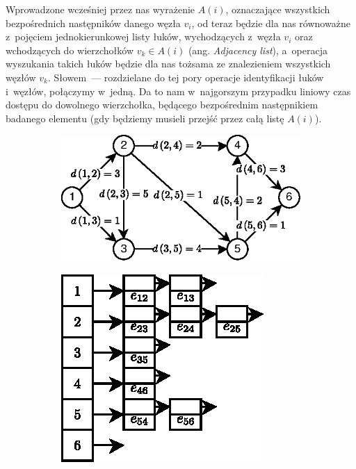 Wprowadzone wcześniej przez nas wyrażenie $A \left( i \right) $, oznaczające wszystkich bezpośrednich następników danego węzła $v_{i}$, od teraz będzie dla nas równoważne z~pojęciem jednokierunkowej listy łuków, wychodzących z~węzła $v_{i}$ oraz wchodzących do wierzchołków $v_{k} \in A \left( i \right)$ (ang. \textit{Adjacency list}), a~operacja wyszukania takich łuków będzie dla nas tożsama ze znalezieniem wszystkich węzłów $v_{k}$. Słowem~---  rozdzielane do tej pory operacje identyfikacji łuków i~węzłów, połączymy w~jedną. Da to nam w~najgorszym przypadku liniowy czas dostępu do dowolnego wierzchołka, będącego bezpośrednim następnikiem badanego elementu (gdy będziemy musieli przejść przez całą listę $A \left( i \right) $). 

\begin{figure}[!htbp]
	\centering
	\begin{subfigure}[b]{0.57\textwidth}
		\includegraphics[width=\textwidth]{Chapter_I/3/1_3a.eps}
		\caption{}
	\end{subfigure}
	\qquad
	\begin{subfigure}[b]{0.33\textwidth}
		\includegraphics[width=\textwidth]{Chapter_I/3/1_3b.eps}

\end{subfigure}
\end{figure}
